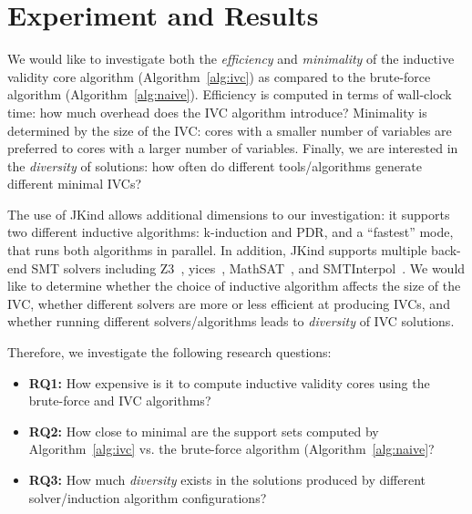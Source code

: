 \section{Experiment and Results}
\label{sec:experiment}


We would like to investigate both the {\em efficiency} and {\em minimality} of the inductive validity core algorithm (Algorithm~\ref{alg:ivc}) as compared to the brute-force algorithm (Algorithm~\ref{alg:naive}).  Efficiency is computed in terms of wall-clock time: how much overhead does the IVC algorithm introduce?  Minimality is determined by the size of the IVC: cores with a smaller number of variables are preferred to cores with a larger number of variables.  Finally, we are interested in the {\em diversity} of solutions: how often do different tools/algorithms generate different minimal IVCs?

The use of JKind allows additional dimensions to our investigation: it supports two different inductive algorithms: k-induction and PDR, and a ``fastest'' mode, that runs both algorithms in parallel.  In addition, JKind supports multiple back-end SMT solvers including Z3~\cite{DeMoura08:z3}, yices~\cite{Dutertre06:yices}, MathSAT~\cite{Cimatti2013:MathSAT}, and SMTInterpol~\cite{Christ2012:SMTInterpol}.  We would like to determine whether the choice of inductive algorithm affects the size of the IVC, whether different solvers are more or less efficient at producing IVCs, and whether running different solvers/algorithms leads to {\em diversity} of IVC solutions.

Therefore, we investigate the following research questions:
\begin{itemize}
    \item \textbf{RQ1:} How expensive is it to compute inductive validity cores using the brute-force and IVC algorithms?
    \item \textbf{RQ2:} How close to minimal are the support sets computed by Algorithm~\ref{alg:ivc} vs. the brute-force algorithm (Algorithm~\ref{alg:naive}?
    \item \textbf{RQ3:} How much {\em diversity} exists in the solutions produced by different solver/induction algorithm configurations?
\end{itemize}

